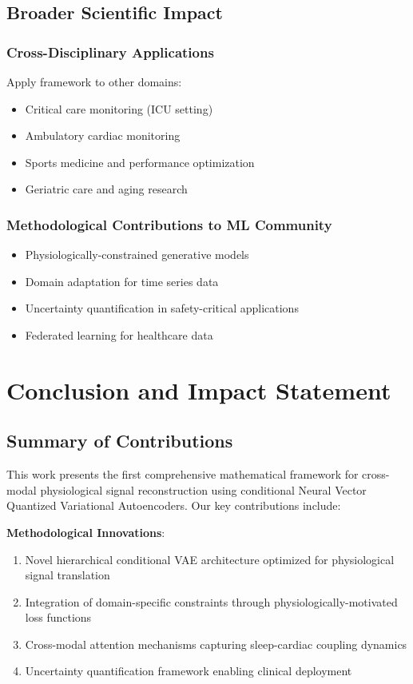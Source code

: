 \documentclass[11pt]{article}
\begin{document}
\subsection{Broader Scientific Impact}

\subsubsection{Cross-Disciplinary Applications}
Apply framework to other domains:
\begin{itemize}
    \item Critical care monitoring (ICU setting)
    \item Ambulatory cardiac monitoring
    \item Sports medicine and performance optimization
    \item Geriatric care and aging research
\end{itemize}

\subsubsection{Methodological Contributions to ML Community}
\begin{itemize}
    \item Physiologically-constrained generative models
    \item Domain adaptation for time series data
    \item Uncertainty quantification in safety-critical applications
    \item Federated learning for healthcare data
\end{itemize}

\section{Conclusion and Impact Statement}
\label{sec:conclusion_impact}

\subsection{Summary of Contributions}

This work presents the first comprehensive mathematical framework for cross-modal physiological signal reconstruction using conditional Neural Vector Quantized Variational Autoencoders. Our key contributions include:

\textbf{Methodological Innovations}:
\begin{enumerate}
    \item Novel hierarchical conditional VAE architecture optimized for physiological signal translation
    \item Integration of domain-specific constraints through physiologically-motivated loss functions
    \item Cross-modal attention mechanisms capturing sleep-cardiac coupling dynamics
    \item Uncertainty quantification framework enabling clinical deployment
\end{enumerate}
\end{document}
